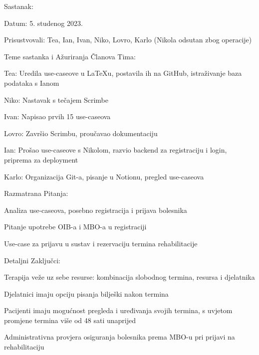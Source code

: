 \begin{packed_enum}
        \item Sastanak:
    \item[] \begin{packed_item}
        \item Datum: 5. studenog 2023.
        \item Prisustvovali: Tea, Ian, Ivan, Niko, Lovro, Karlo (Nikola odsutan zbog operacije)
        \item Teme sastanka i Ažuriranja Članova Tima:
            \begin{packed_item}
                \item Tea: Uredila use-caseove u LaTeXu, postavila ih na GitHub, istraživanje baza podataka s Ianom
                \item Niko: Nastavak s tečajem Scrimbe
                \item Ivan: Napisao prvih 15 use-caseova
                \item Lovro: Završio Scrimbu, proučavao dokumentaciju
                \item Ian: Prošao use-caseove s Nikolom, razvio backend za registraciju i login, priprema za deployment
                \item Karlo: Organizacija Git-a, pisanje u Notionu, pregled use-caseova
            \end{packed_item}
        \item Razmatrana Pitanja:
            \begin{packed_item}
                \item Analiza use-caseova, posebno registracija i prijava bolesnika
                \item Pitanje upotrebe OIB-a i MBO-a u registraciji
                \item Use-case za prijavu u sustav i rezervaciju termina rehabilitacije
            \end{packed_item}
        \item Detaljni Zaključci:
            \begin{packed_item}
                \item Terapija veže uz sebe resurse: kombinacija slobodnog termina, resursa i djelatnika
                \item Djelatnici imaju opciju pisanja bilješki nakon termina
                \item Pacijenti imaju mogućnost pregleda i uređivanja svojih termina, s uvjetom promjene termina više od 48 sati unaprijed
                \item Administrativna provjera osiguranja bolesnika prema MBO-u pri prijavi na rehabilitaciju

\end{packed_item}
\end{packed_item}
\end{packed_enum}
